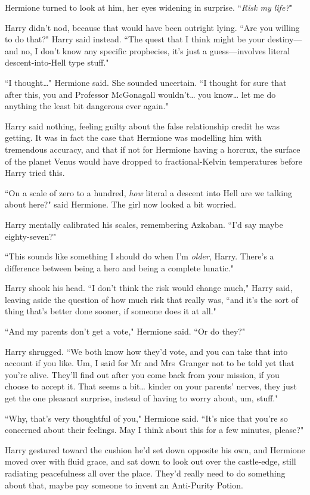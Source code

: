 Hermione turned to look at him, her eyes widening in surprise. ``\emph{Risk my life?}"

Harry didn't nod, because that would have been outright lying. ``Are you willing to do that?" Harry said instead. ``The quest that I think might be your destiny—and no, I don't know any specific prophecies, it's just a guess—involves literal descent-into-Hell type stuff."

``I thought{\ldots}" Hermione said. She sounded uncertain. ``I thought for sure that after this, you and Professor McGonagall wouldn't{\ldots} you know{\ldots} let me do anything the least bit dangerous ever again."

Harry said nothing, feeling guilty about the false relationship credit he was getting. It was in fact the case that Hermione was modelling him with tremendous accuracy, and that if not for Hermione having a horcrux, the surface of the planet Venus would have dropped to fractional-Kelvin temperatures before Harry tried this.

``On a scale of zero to a hundred, \emph{how} literal a descent into Hell are we talking about here?" said Hermione. The girl now looked a bit worried.

Harry mentally calibrated his scales, remembering Azkaban. ``I'd say maybe eighty-seven?"

``This sounds like something I should do when I'm \emph{older}, Harry. There's a difference between being a hero and being a complete lunatic."

Harry shook his head. ``I don't think the risk would change much," Harry said, leaving aside the question of how much risk that really was, ``and it's the sort of thing that's better done sooner, if someone does it at all."

``And my parents don't get a vote," Hermione said. ``Or do they?"

Harry shrugged. ``We both know how they'd vote, and you can take that into account if you like. Um, I said for Mr and Mrs~Granger not to be told yet that you're alive. They'll find out after you come back from your mission, if you choose to accept it. That seems a bit{\ldots} kinder on your parents' nerves, they just get the one pleasant surprise, instead of having to worry about, um, stuff."

``Why, that's very thoughtful of you," Hermione said. ``It's nice that you're so concerned about their feelings. May I think about this for a few minutes, please?"

Harry gestured toward the cushion he'd set down opposite his own, and Hermione moved over with fluid grace, and sat down to look out over the castle-edge, still radiating peacefulness all over the place. They'd really need to do something about that, maybe pay someone to invent an Anti-Purity Potion.

